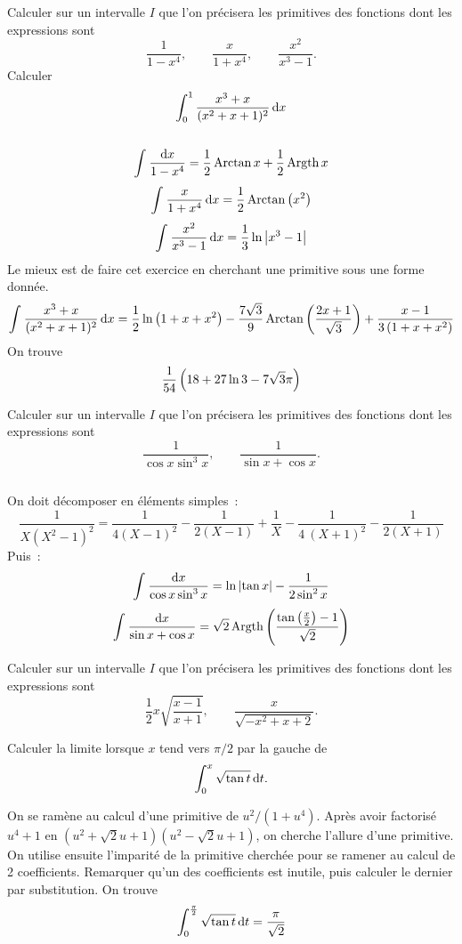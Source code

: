 \documentclass{magnolia}
\begin{document}

\begin{questions}
\question Calculer sur un intervalle $I$ que l'on précisera les primitives des
  fonctions dont les expressions sont
  \[\frac{1}{1-x^4}, \qquad \frac{x}{1+x^4}, \qquad \frac{x^2}{x^3-1}.\]
\question Calculer
  \[\integ{0}{1}{\frac{x^3+x}{(x^2+x+1)^2}}{x}\]
\end{questions}
\begin{sol}
$\quad$
\begin{questions}
\question
  \[\priminv{1-x^4}{x}=\frac{1}{2}\arctan x+\frac{1}{2}\argth x\]
  \[\prim{\frac{x}{1+x^4}}{x}=\frac{1}{2}\arctan\p{x^2}\]
  \[\prim{\frac{x^2}{x^3-1}}{x}=\frac{1}{3}\ln\abs{x^3-1}\]
\question Le mieux est de faire cet exercice en cherchant une primitive sous
  une forme donnée.
  \[\prim{\frac{x^3+x}{(x^2+x+1)^2}}{x}=\frac{1}{2} \ln\p{1+x+x^2}
    -\frac{7\sqrt{3}}{9}
    \arctan\p{\frac{2 x+1}{\sqrt{3}}}+\frac{x-1}{3 \p{1+x+x^2}}\]
  On trouve
  \[\frac{1}{54}\p{18+27\ln 3-7\sqrt{3}\pi}\]
\end{questions}
\end{sol}

Calculer sur un intervalle $I$ que l'on précisera les primitives des
fonctions dont les expressions sont
\[\frac{1}{\cos x\sin^3 x}, \qquad \frac{1}{\sin x+\cos x}.\]
\begin{sol}
$\quad$
\begin{questions}
  \question On doit décomposer en éléments simples~:
  \[\frac{1}{X \left(X^2-1 \right)^2}=
    \frac{1}{4 (X-1)^2}-\frac{1}{2 (X-1)}+\frac{1}{X}-\frac{1}{4 \
    (X+1)^2}-\frac{1}{2 (X+1)}\]
  Puis~:
  \[\priminv{\cos x\sin^3 x}{x}=\ln\abs{\tan x}-\frac{1}{2\sin^2 x}\]
\question
  \[\priminv{\sin x+\cos x}{x}=\sqrt{2}
    \argth\p{\frac{\tan\p{\frac{x}{2}}-1}{\sqrt{2}}}\]
\end{questions}
\end{sol}

Calculer sur un intervalle $I$ que l'on précisera les primitives des
fonctions dont les expressions sont
\[\frac{1}{2}x\sqrt{\frac{x-1}{x+1}}, \qquad \frac{x}{\sqrt{-x^2+x+2}}.\]

Calculer la limite lorsque $x$ tend vers $\pi/2$ par la gauche de
\[\integ{0}{x}{\sqrt{\tan t}}{t}.\]
\begin{sol}
On se ramène au calcul d'une primitive de $u^2/(1+u^4)$. Après avoir
factorisé $u^4+1$ en $(u^2+\sqrt{2}u+1)(u^2-\sqrt{2}u+1)$, on cherche
l'allure d'une primitive. On utilise ensuite l'imparité de la primitive
cherchée pour se ramener au calcul de 2 coefficients. Remarquer qu'un des
coefficients est inutile, puis calculer le dernier par substitution. On trouve
\[\integ{0}{\frac{\pi}{2}}{\sqrt{\tan t}}{t}=\frac{\pi}{\sqrt{2}}\]
\end{sol}
\end{document}
